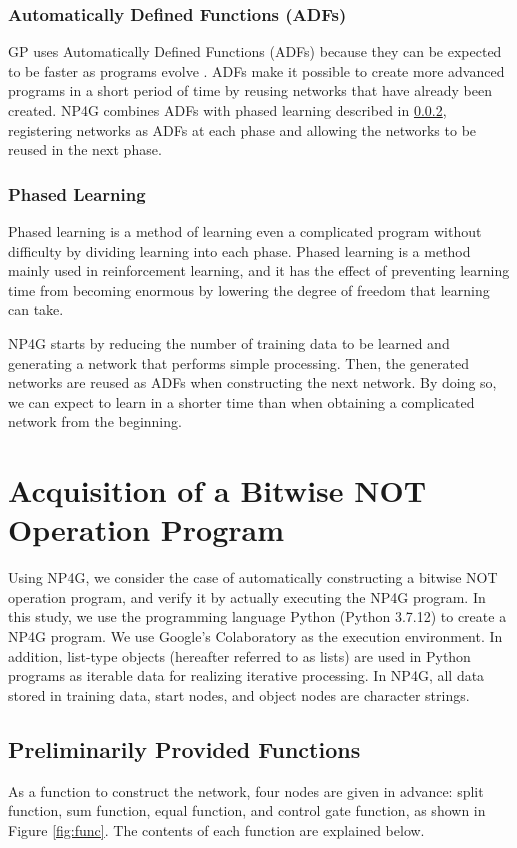 \documentclass{article}
\begin{document}
\subsubsection {Automatically Defined Functions (ADFs)}
GP uses Automatically Defined Functions (ADFs) because they can be expected to be faster as programs evolve \cite{adfs}.
ADFs make it possible to create more advanced programs in a short period of time by reusing networks that have already been created.
NP4G combines ADFs with phased learning described in \ref{sec:PL}, registering networks as ADFs at each phase and allowing the networks to be reused in the next phase.

\subsubsection {Phased Learning}
\label{sec:PL}
Phased learning is a method of learning even a complicated program without difficulty by dividing learning into each phase.
Phased learning is a method mainly used in reinforcement learning, and it has the effect of preventing learning time from becoming enormous by lowering the degree of freedom that learning can take.

NP4G starts by reducing the number of training data to be learned and generating a network that performs simple processing.
Then, the generated networks are reused as ADFs when constructing the next network.
By doing so, we can expect to learn in a shorter time than when obtaining a complicated network from the beginning.

\section {Acquisition of a Bitwise NOT Operation Program}
Using NP4G, we consider the case of automatically constructing a bitwise NOT operation program, and verify it by actually executing the NP4G program.
In this study, we use the programming language Python (Python 3.7.12) to create a NP4G program.
We use Google's Colaboratory as the execution environment.
In addition, list-type objects (hereafter referred to as lists) are used in Python programs as iterable data for realizing iterative processing.
In NP4G, all data stored in training data, start nodes, and object nodes are character strings.

\subsection {Preliminarily Provided Functions}
As a function to construct the network, four nodes are given in advance: split function, sum function, equal function, and control gate function, as shown in Figure \ref{fig:func}.
The contents of each function are explained below.
\end{document}
